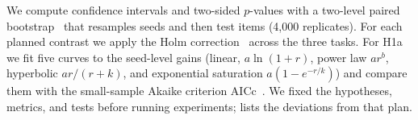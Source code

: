 We compute confidence intervals and two-sided $p$-values with a two-level paired bootstrap~\citep{efron1979bootstrap} that resamples seeds and then test items (4,000 replicates).
For each planned contrast we apply the Holm correction~\citep{holm1979simple} across the three tasks.
For H1a we fit five curves to the seed-level gains (linear, $a\ln(1+r)$, power law $a r^b$, hyperbolic $a r/(r+k)$, and exponential saturation $a(1-e^{-r/k})$) and compare them with the small-sample Akaike criterion AICc~\citep{hurvich1989regression}.
We fixed the hypotheses, metrics, and tests before running experiments;  lists the deviations from that plan.
